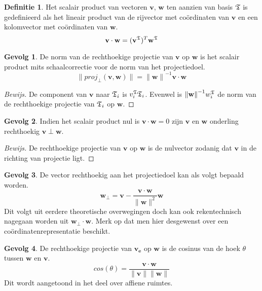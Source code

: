 \documentclass{amsart}
\theoremstyle{definition}
\newtheorem{dfn}{Definitie}[section]
\newtheorem{csq}{Gevolg}[section]
\newenvironment{bewijs}{\begin{proof}[Bewijs]}{\end{proof}}
\newcommand{\norm}[1]{\lVert{#1}\rVert}
\newcommand{\vvec}[1][v]{\mathbf{#1}}
\newcommand{\uvec}[1][v]{\vvec[#1]_\mathbf{e}}
\newcommand{\vnorm}[1]{\norm{\vvec[#1]}}
\newcommand{\vecrow}[1][a]{\mathfrak{\MakeUppercase{#1}}}
\newcommand{\rvec}[2][i]{{#2}_{#1}}
\newcommand{\rvecr}[2][i]{\rvec[#1]{\vecrow[#2]}}
\newcommand{\cvec}[2]{{#1}^{#2}}
\newcommand{\cvecv}[2][v]{\cvec{\vvec[#1]}{#2}}
\newcommand{\cvecva}[1][a]{\cvecv{\vecrow[#1]}}
\newcommand{\cvecc}[2][a]{\cvecv[#2]{\vecrow[#1]}}
\newcommand{\vcord}[3]{{#1}_{#2}^{#3}}
\newcommand{\vcordv}[3][v]{\vcord{#1}{#2}{\vecrow[#3]}}
\newcommand{\vcordvi}[2][i]{\vcordv{#1}{#2}}
\begin{document}
\begin{dfn}
	Het scalair product van vectoren $\vvec$, $\vvec[w]$ ten aanzien van basis $\vecrow[t]$ is gedefinieerd als het lineair product van de rijvector met coördinaten van $\vvec$ en een kolomvector met coördinaten van $\vvec[w]$.
	\begin{equation*}
		\vvec \cdot \vvec[w] = (\cvecva[t])^T \cvecc[t]{w}
	\end{equation*}
\end{dfn}

\begin{csq}
	De norm van de rechthoekige projectie van $\vvec$ op $\vvec[w]$ is het scalair product mits schaalcorrectie voor de norm van het projectiedoel.
	\begin{equation*}
		\norm{proj_\perp(\vvec, \vvec[w])} = {\vnorm w}^{-1}\vvec \cdot \vvec[w]
	\end{equation*}
	\begin{bewijs}
		De component van $\vvec$ naar $\rvecr{t}$ is $\vcordvi{t}\rvecr{t}$. Evenwel is ${\vnorm w}^{-1}\vcordv[w]{i}{t}$ de norm van de rechthoekige projectie van $\rvecr{t}$ op $\vvec[w]$.
	\end{bewijs}
\end{csq}

\begin{csq}
	Indien het scalair product nul is $\vvec \cdot\vvec[w] = 0$ zijn $\vvec$ en $\vvec[w]$ onderling rechthoekig $\vvec\perp\vvec[w]$.
	\begin{bewijs}
		De rechthoekige projectie van $\vvec$ op $\vvec[w]$ is de nulvector zodanig dat $\vvec$ in de richting van projectie ligt.
	\end{bewijs}
\end{csq}

\begin{csq}
	De vector rechthoekig aan het projectiedoel kan als volgt bepaald worden.
	\begin{equation*}
		\vvec[w]_\perp = \vvec - \frac{\vvec\cdot\vvec[w]}{\vnorm w^2}\vvec[w]
	\end{equation*}
	Dit volgt uit eerdere theoretische overwegingen doch kan ook rekentechnisch nagegaan worden uit $\vvec[w]_\perp\cdot\vvec[w]$.
	Merk op dat men hier desgewenst over een coördinatenrepresentatie beschikt.
\end{csq}

\begin{csq}
	De rechthoekige projectie van $\uvec$ op $\vvec[w]$ is de cosinus van de hoek $\theta$ tussen $\vvec[w]$ en $\vvec$.
	\begin{equation*}
		cos(\theta) = \frac{\vvec \cdot \vvec[w]}{\vnorm v\vnorm w}
	\end{equation*}
	Dit wordt aangetoond in het deel over affiene ruimtes.
\end{csq}
\end{document}
